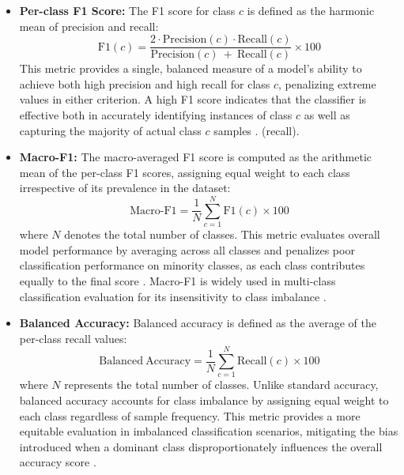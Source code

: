 \documentclass[gmd, manuscript]{copernicus}
\begin{document}
\begin{itemize}
\item \textbf{Per-class F1 Score:} The F1 score for class $c$ is defined as the harmonic mean of precision and recall:
$$\mathrm{F1}(c) = \frac{2\cdot \mathrm{Precision}(c)\cdot \mathrm{Recall}(c)}{\mathrm{Precision}(c)~ + ~ \mathrm{Recall}(c)} \times 100$$
This metric provides a single, balanced measure of a model's ability to achieve both high precision and high recall for class $c$, penalizing extreme values in either criterion. A high F1 score indicates that the classifier is effective both in accurately identifying instances of class $c$ as well as capturing the majority of actual class $c$ samples \citep{powers2020evaluation}.
 (recall).
\item \textbf{Macro-F1:} The macro-averaged F1 score is computed as the arithmetic mean of the per-class F1 scores, assigning equal weight to each class irrespective of its prevalence in the dataset:
$$\mathrm{Macro\text{-}F1} = \frac{1}{N} \sum_{c=1}^{N} \mathrm{F1}(c) \times 100$$
where $N$ denotes the total number of classes. This metric evaluates overall model performance by averaging across all classes and penalizes poor classification performance on minority classes, as each class contributes equally to the final score \citep{powers2020evaluation}. Macro-F1 is widely used in multi-class classification evaluation for its insensitivity to class imbalance \citep{brodersen2010balanced}.
\item \textbf{Balanced Accuracy:} Balanced accuracy is defined as the average of the per-class recall values:
$$\mathrm{Balanced\ Accuracy} = \frac{1}{N} \sum_{c=1}^{N} \mathrm{Recall}(c) \times 100 $$
where $N$ represents the total number of classes. Unlike standard accuracy, balanced accuracy accounts for class imbalance by assigning equal weight to each class regardless of sample frequency. This metric provides a more equitable evaluation in imbalanced classification scenarios, mitigating the bias introduced when a dominant class disproportionately influences the overall accuracy score \cite{brodersen2010balanced, sensoressa2024balanced}.



\end{itemize}
\end{document}
